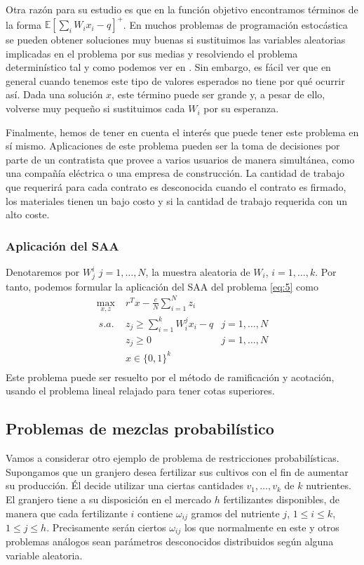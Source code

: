\documentclass[twoside,a4paper,openright,12pt]{book}
\newcommand{\E}{\mathbb{E}}
\providecommand{\posi}[1]{\left[#1\right]^+}
\begin{document}
Otra razón para su estudio es que en la función objetivo encontramos términos de la forma $\E\posi{\sum_i W_ix_i-q}$. En muchos problemas de programación estocástica se pueden obtener soluciones muy buenas si sustituimos las variables aleatorias implicadas en el problema por sus medias y resolviendo el problema determinístico tal y como podemos ver en \cite{cita1}. Sin embargo, es fácil ver que en general cuando tenemos este tipo de valores esperados no tiene por qué ocurrir así. Dada una solución $x$, este término puede ser grande y, a pesar de ello, volverse muy pequeño si sustituimos cada $W_i$ por su esperanza. 

Finalmente, hemos de tener en cuenta el interés que puede tener este problema en sí mismo. Aplicaciones de este problema pueden ser la toma de decisiones por parte de un contratista que provee a varios usuarios de manera simultánea, como una compañía eléctrica o una empresa de construcción. La cantidad de trabajo que requerirá para cada contrato es desconocida cuando el contrato es firmado, los materiales tienen un bajo costo y si la cantidad de trabajo requerida con un alto coste.
\subsubsection*{Aplicación del SAA}
Denotaremos por $W^i_j$ $j=1,\dotsc,N$, la muestra aleatoria de $W_i$, $i=1,\dotsc,k$. Por tanto, podemos formular la aplicación del SAA del problema \ref{eq:5} como
\begin{align*}	
\max_{x,z}&\; r^Tx  -\frac{c}{N}\sum_{i=1}^N z_i \\\
s.a.
& \; z_j \geq \sum_{i=1}^kW_i^jx_i - q  & j=1,\dotsc,N\\ 
&\; z_j\geq 0 &j=1,\dotsc,N  \\
& \; x\in\{0,1\}^k\\
\end{align*}
Este problema puede ser resuelto por el método de ramificación y acotación, usando el problema lineal relajado para tener cotas superiores.
\subsection{Problemas de mezclas probabilístico}
Vamos a considerar otro ejemplo de problema de restricciones probabilísticas. Supongamos que un granjero desea fertilizar sus cultivos con el fin de aumentar su producción. Él decide utilizar una ciertas cantidades $v_1,\dotsc,v_k$ de $k$ nutrientes. El granjero tiene a su disposición en el mercado $h$ fertilizantes disponibles, de manera que cada fertilizante $i$ contiene $\omega_{ij}$ gramos del nutriente $j$, $1\leq i \leq k$, $1 \leq j \leq h$. Precisamente serán ciertos $\omega_{ij}$ los que normalmente en este y otros problemas análogos sean parámetros desconocidos distribuidos según alguna variable aleatoria.
\end{document}
